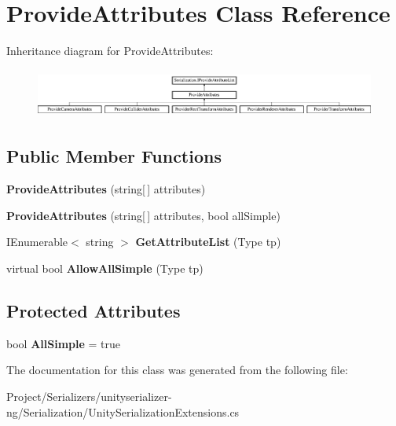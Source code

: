 \hypertarget{class_provide_attributes}{}\section{Provide\+Attributes Class Reference}
\label{class_provide_attributes}
Inheritance diagram for Provide\+Attributes\+:\begin{figure}[H]
\begin{center}
\leavevmode
\includegraphics[height=1.631068cm]{class_provide_attributes}
\end{center}
\end{figure}
\subsection*{Public Member Functions}
\begin{DoxyCompactItemize}
\item 
\mbox{\label{class_provide_attributes_af23612d88d5f7699f6344fa0472888df}} 
{\bfseries Provide\+Attributes} (string\mbox{[}$\,$\mbox{]} attributes)
\item 
\mbox{\label{class_provide_attributes_ab743242073ce772ded09b371409283ad}} 
{\bfseries Provide\+Attributes} (string\mbox{[}$\,$\mbox{]} attributes, bool all\+Simple)
\item 
\mbox{\label{class_provide_attributes_aa43c5b30e202787ad574923f414c7eb3}} 
I\+Enumerable$<$ string $>$ {\bfseries Get\+Attribute\+List} (Type tp)
\item 
\mbox{\label{class_provide_attributes_a9b4c8e178f74bc4fc69ed9b2747f173d}} 
virtual bool {\bfseries Allow\+All\+Simple} (Type tp)
\end{DoxyCompactItemize}
\subsection*{Protected Attributes}
\begin{DoxyCompactItemize}
\item 
\mbox{\label{class_provide_attributes_a64e5e27c26a7a969189543b2a6a6467b}} 
bool {\bfseries All\+Simple} = true
\end{DoxyCompactItemize}


The documentation for this class was generated from the following file\+:\begin{DoxyCompactItemize}
\item 
Project/\+Serializers/unityserializer-\/ng/\+Serialization/Unity\+Serialization\+Extensions.\+cs\end{DoxyCompactItemize}
